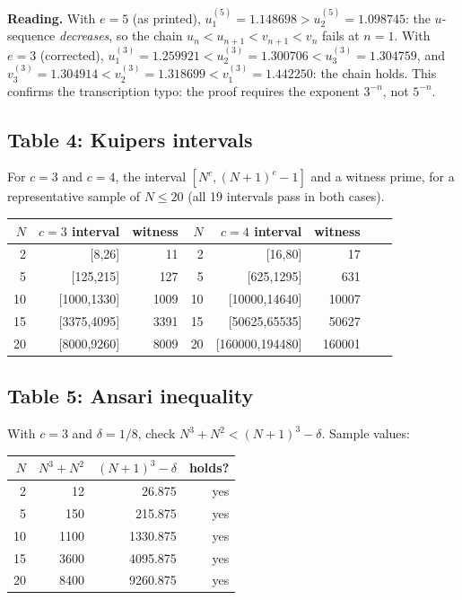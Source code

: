 \documentclass[11pt,reqno]{amsart}
\theoremstyle{redplain}
\numberwithin{equation}{section}
\begin{document}
\textbf{Reading.} With $e=5$ (as printed), $u_1^{(5)}=1.148698 >
u_2^{(5)}=1.098745$: the $u$-sequence \emph{decreases}, so the chain
$u_n<u_{n+1}<v_{n+1}<v_n$ fails at $n=1$. With $e=3$ (corrected),
$u_1^{(3)}=1.259921<u_2^{(3)}=1.300706<u_3^{(3)}=1.304759$, and
$v_3^{(3)}=1.304914<v_2^{(3)}=1.318699<v_1^{(3)}=1.442250$: the chain
holds. This confirms the transcription typo: the proof requires the
exponent $3^{-n}$, not $5^{-n}$.

\subsection{Table 4: Kuipers intervals}

For $c=3$ and $c=4$, the interval $[N^c,(N+1)^c-1]$ and a witness prime,
for a representative sample of $N\le20$ (all 19 intervals pass in both
cases).

\begin{center}
\begin{tabular}{rrrr|rrrr}
\toprule
$N$ & $c=3$ interval & witness & $N$ & $c=4$ interval & witness & &\\
\midrule
2  & [8,26]          & 11    & 2  & [16,80]        & 17    & &\\
5  & [125,215]       & 127   & 5  & [625,1295]     & 631   & &\\
10 & [1000,1330]     & 1009  & 10 & [10000,14640]  & 10007 & &\\
15 & [3375,4095]     & 3391  & 15 & [50625,65535]  & 50627 & &\\
20 & [8000,9260]     & 8009  & 20 & [160000,194480]& 160001& &\\
\bottomrule
\end{tabular}
\end{center}

\subsection{Table 5: Ansari inequality}

With $c=3$ and $\delta=1/8$, check $N^3+N^2<(N+1)^3-\delta$. Sample
values:

\begin{center}
\begin{tabular}{rrrr}
\toprule
$N$ & $N^3+N^2$ & $(N+1)^3-\delta$ & holds?\\
\midrule
2  & 12   & 26.875   & yes \\
5  & 150  & 215.875  & yes \\
10 & 1100 & 1330.875 & yes \\
15 & 3600 & 4095.875 & yes \\
20 & 8400 & 9260.875 & yes \\
\bottomrule
\end{tabular}
\end{center}
\end{document}

